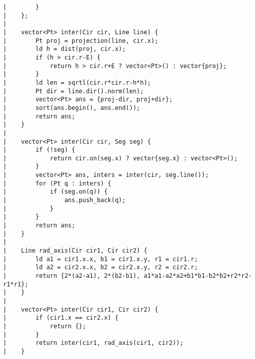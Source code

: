 \documentclass[a4paper, 10pt]{article}
\begin{document}
\begin{center}
\begin{verbatim}
|        }
|    };
|    
|    vector<Pt> inter(Cir cir, Line line) {
|        Pt proj = projection(line, cir.x);
|        ld h = dist(proj, cir.x);
|        if (h > cir.r-E) {
|            return h > cir.r+E ? vector<Pt>() : vector{proj};
|        }
|        ld len = sqrtl(cir.r*cir.r-h*h);
|        Pt dir = line.dir().norm(len);
|        vector<Pt> ans = {proj-dir, proj+dir};
|        sort(ans.begin(), ans.end());
|        return ans;
|    }
|    
|    vector<Pt> inter(Cir cir, Seg seg) {
|        if (!seg) {
|            return cir.on(seg.x) ? vector{seg.x} : vector<Pt>();
|        }
|        vector<Pt> ans, inters = inter(cir, seg.line());
|        for (Pt q : inters) {
|            if (seg.on(q)) {
|                ans.push_back(q);
|            }
|        }
|        return ans;
|    }
|    
|    Line rad_axis(Cir cir1, Cir cir2) {
|        ld a1 = cir1.x.x, b1 = cir1.x.y, r1 = cir1.r;
|        ld a2 = cir2.x.x, b2 = cir2.x.y, r2 = cir2.r;
|        return {2*(a2-a1), 2*(b2-b1), a1*a1-a2*a2+b1*b1-b2*b2+r2*r2-r1*r1};
|    }
|    
|    vector<Pt> inter(Cir cir1, Cir cir2) {
|        if (cir1.x == cir2.x) {
|            return {};
|        }
|        return inter(cir1, rad_axis(cir1, cir2));
|    }
\end{verbatim}


\end{center}
\end{document}
